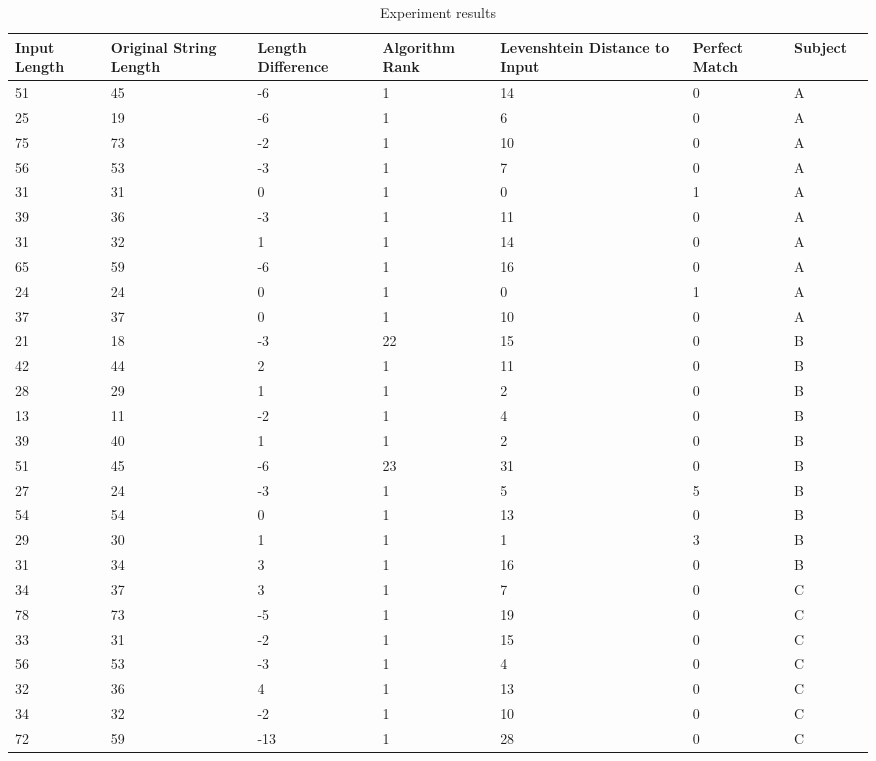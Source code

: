 \centering
\begin{longtable}{ p{2cm} p{2cm} p{2cm} p{2cm} p{2cm} p{2cm} p{2cm} p{2cm}}
\caption{Experiment results}
  \hline
Input Length & Original String Length  & Length Difference & Algorithm Rank & Levenshtein Distance to Input & Perfect Match & Subject \\ 
  \hline
51 &  45 &  -6 &   1 &  14 &   0 &   A \\ 
25 &  19 &  -6 &   1 &   6 &   0 &   A \\ 
75 &  73 &  -2 &   1 &  10 &   0 &   A \\ 
56 &  53 &  -3 &   1 &   7 &   0 &   A \\ 
31 &  31 &   0 &   1 &   0 &   1 &   A \\ 
39 &  36 &  -3 &   1 &  11 &   0 &   A \\ 
31 &  32 &   1 &   1 &  14 &   0 &   A \\ 
65 &  59 &  -6 &   1 &  16 &   0 &   A \\ 
24 &  24 &   0 &   1 &   0 &   1 &   A \\ 
 37 &  37 &  0 &   1 &  10 &   0 &   A \\ 
 21 &  18 &  -3 &  22 &  15 &   0 &   B \\ 
 42 &  44 &   2 &   1 &  11 &   0 &   B \\ 
 28 &  29 &   1 &   1 &   2 &   0 &   B \\ 
 13 &  11 &  -2 &   1 &   4 &   0 &   B \\ 
 39 &  40 &   1 &   1 &   2 &   0 &   B \\ 
 51 &  45 &  -6 &  23 &  31 &   0 &   B \\ 
 27 &  24 &  -3 &   1 &   5 &   5 &   B \\ 
 54 &  54 &   0 &   1 &  13 &   0 &   B \\ 
 29 &  30 &   1 &   1 &   1 &   3 &   B \\ 
 31 &  34 &   3 &   1 &  16 &   0 &   B \\ 
 34 &  37 &   3 &   1 &   7 &   0 &   C \\ 
 78 &  73 &  -5 &   1 &  19 &   0 &   C \\ 
 33 &  31 &  -2 &   1 &  15 &   0 &   C \\ 
 56 &  53 &  -3 &   1 &   4 &   0 &   C \\ 
 32 &  36 &   4 &   1 &  13 &   0 &   C \\ 
 34 &  32 &  -2 &   1 &  10 &   0 &   C \\ 
 72 &  59 & -13 &   1 &  28 &   0 &   C \\ 

\end{longtable}

